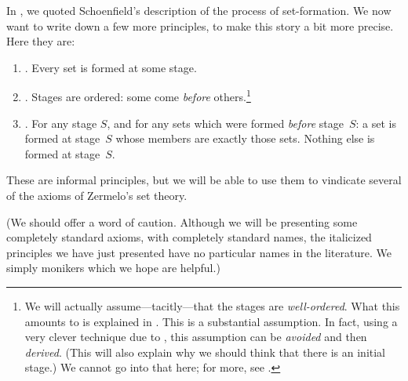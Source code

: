 \documentclass[../../../include/open-logic-section]{subfiles}
\begin{document}
	
In , we quoted Schoenfield's
description of the process of set-formation. We now want to write down
a few more principles, to make this story a bit more precise. Here
they are:
\begin{enumerate}
\item[] \stageshier. Every set is formed at some stage.
\item[] \stagesord. Stages are ordered: some come \emph{before}
others.\footnote{We will actually assume---tacitly---that the stages
are \emph{well-ordered}. What this amounts to is explained in
. This is a substantial assumption. In fact,
using a very clever technique due to \citet{Scott1974}, this
assumption can be \emph{avoided} and then \emph{derived}. (This will
also explain why we should think that there is an initial stage.) We cannot go into that here; for more, see \citet{ButtonLT1}.} 
\item[] \stagesacc. For any stage $S$, and for any sets which were
formed \emph{before} stage~$S$: a set is formed at stage~$S$ whose
members are exactly those sets. Nothing else is formed at stage~$S$.
\end{enumerate}
These are informal principles, but we will be able to use them to
vindicate several of the axioms of Zermelo's set theory. 

(We should offer a word of caution. Although we will be presenting some
completely standard axioms, with completely standard names, the
italicized principles we have just presented have no particular names
in the literature. We simply monikers which we hope are helpful.)
\end{document}
